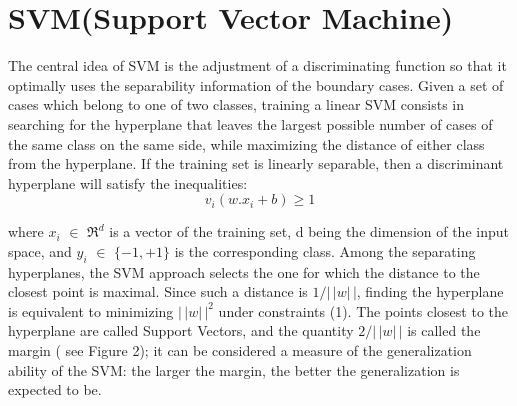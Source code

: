\section {SVM(Support Vector Machine)}
The  central  idea  of SVM  is  the  adjustment  of  a  discriminating  function  so  that  it  optimally  uses  the  separability information of the boundary cases. Given a set of cases which belong  to one of  two classes,  training a  linear SVM consists  in  searching  for  the hyperplane  that  leaves  the  largest possible number of  cases  of  the  same  class  on  the same side, while maximizing the distance of either class from the hyperplane. If the training set is linearly separable, then a discriminant hyperplane will satisfy the inequalities:
\begin{equation}
v_{i}(w.x_{i}+b) \geq 1
\end{equation}

 where $x_{i}$  $\in$  $\Re^d$ is a  vector  of  the  training  set,  d  being  the  dimension  of  the  input  space,  and $y_{i}$  $\in$ ${\{-1,+1\}}$ is  the corresponding class. Among the separating hyperplanes, the SVM approach selects the one for which the distance to the closest point is maximal. Since  such a distance  is  $1/|\,|w|\,|$,  finding  the  hyperplane  is  equivalent  to minimizing $|\,|w|\,|^2$   under constraints (1). The points closest to the hyperplane are called Support Vectors, and the quantity   $2/|\,|w|\,|$  is called  the margin  (  see Figure 2);  it can be considered a measure of  the generalization ability of  the SVM:  the larger the margin, the better the generalization is expected to be.

